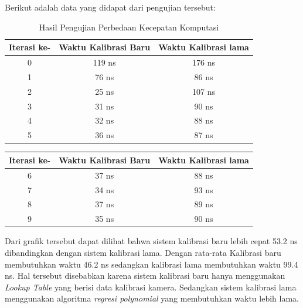 Berikut adalah data yang didapat dari pengujian tersebut:

\begin{longtable}{|c|c|c|}
  \caption{Hasil Pengujian Perbedaan Kecepatan Komputasi}
  \label{tb:posisibolalapangan120lama}                                   \\
  \hline
  \rowcolor[HTML]{C0C0C0}
  \textbf{Iterasi ke-} & \textbf{Waktu Kalibrasi Baru} & \textbf{Waktu Kalibrasi lama} \\
  \hline
  0            & 119 ns                & 176 ns            \\
  1           & 76 ns                & 86 ns            \\
  2           & 25 ns                & 107 ns            \\
  3           & 31 ns                & 90 ns           \\
  4           & 32 ns                & 88 ns           \\
  5           & 36 ns                & 87 ns           \\
  \hline
\end{longtable}

\begin{longtable}{|c|c|c|}
  \hline
  \rowcolor[HTML]{C0C0C0}
  \textbf{Iterasi ke-} & \textbf{Waktu Kalibrasi Baru} & \textbf{Waktu Kalibrasi lama} \\
  \hline
  6           & 37 ns                & 88 ns           \\
  7           & 34 ns                & 93 ns           \\
  8           & 37 ns                & 89 ns           \\
  9           & 35 ns                & 90 ns           \\
  \hline
\end{longtable}

Dari grafik tersebut dapat dilihat bahwa sistem kalibrasi baru lebih cepat 53.2 ns dibandingkan dengan sistem kalibrasi lama. Dengan rata-rata Kalibrasi baru membutuhkan waktu 46.2 ns sedangkan kalibrasi lama membutuhkan waktu 99.4 ns. Hal tersebut disebabkan karena sistem kalibrasi baru hanya menggunakan \emph{Lookup Table} yang berisi data kalibrasi kamera. Sedangkan sistem kalibrasi lama menggunakan algoritma \emph{regresi polynomial} yang membutuhkan waktu lebih lama.
